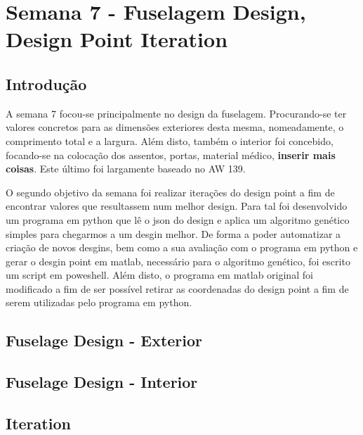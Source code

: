 \section{Semana 7 - Fuselagem Design, Design Point Iteration}

\subsection{Introdução}
A semana 7 focou-se principalmente no design da fuselagem. Procurando-se ter valores concretos para as dimensões exteriores desta mesma, nomeadamente, o comprimento total e a largura. Além disto, também o interior foi concebido, focando-se na colocação dos assentos, portas, material médico, \textbf{inserir mais coisas}. Este último foi largamente baseado no AW 139.\par
O segundo objetivo da semana foi realizar iterações do design point a fim de encontrar valores que resultassem num melhor design. Para tal foi desenvolvido um programa em python que lê o json do design e aplica um algoritmo genético simples para chegarmos a um desgin melhor. De forma a poder automatizar a criação de novos desgins, bem como a sua avaliação com o programa em python e gerar o desgin point em matlab, necessário para o algoritmo genético, foi escrito um script em poweshell. Além disto, o programa em matlab original foi modificado a fim de ser possível retirar as coordenadas do design point a fim de serem utilizadas pelo programa em python. 
\subsection{Fuselage Design - Exterior}
\subsection{Fuselage Design - Interior}
\subsection{Iteration}